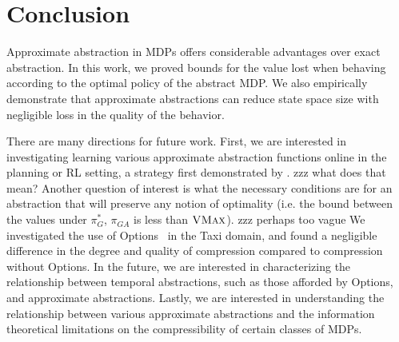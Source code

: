 \section{Conclusion}

Approximate abstraction in \acp{MDP} offers considerable advantages over exact abstraction. In this work, we proved bounds for the value lost when behaving according to the optimal policy of the abstract \ac{MDP}. We also empirically demonstrate that approximate abstractions can reduce state space size with negligible loss in the quality of the behavior.


There are many directions for future work.
First, we are interested in investigating learning various approximate abstraction functions online in the planning or \ac{RL} setting, a strategy first demonstrated by \citeauthor{ortner2013adaptive}. 
zzz what does that mean?
Another question of interest is what the necessary conditions are for an abstraction that will preserve any notion of optimality (i.e. the bound between the values under $\pi_G^*$, $\pi_{GA}$ is less than $\textsc{VMax}$).
zzz perhaps too vague
We investigated the use of Options~\cite{sutton1999between} in the Taxi domain, and found a negligible difference in the degree and quality of compression compared to compression without Options. In the future, we are interested in characterizing the relationship between temporal abstractions, such as those afforded by Options, and approximate abstractions.
Lastly, we are interested in understanding the relationship between various approximate abstractions and the information theoretical limitations on the compressibility of certain classes of \acp{MDP}.

